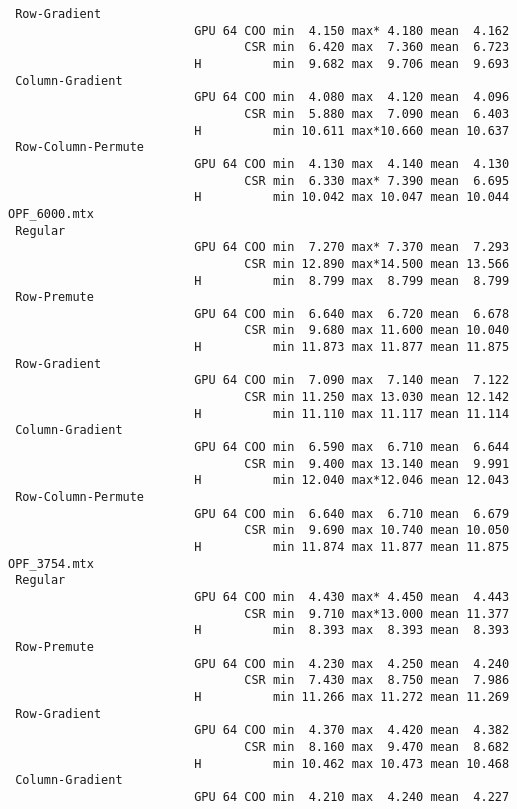 {\begin{verbatim}
 Row-Gradient
                          GPU 64 COO min  4.150 max* 4.180 mean  4.162
                                 CSR min  6.420 max  7.360 mean  6.723
                          H          min  9.682 max  9.706 mean  9.693
 Column-Gradient
                          GPU 64 COO min  4.080 max  4.120 mean  4.096
                                 CSR min  5.880 max  7.090 mean  6.403
                          H          min 10.611 max*10.660 mean 10.637
 Row-Column-Permute
                          GPU 64 COO min  4.130 max  4.140 mean  4.130
                                 CSR min  6.330 max* 7.390 mean  6.695
                          H          min 10.042 max 10.047 mean 10.044
OPF_6000.mtx
 Regular
                          GPU 64 COO min  7.270 max* 7.370 mean  7.293
                                 CSR min 12.890 max*14.500 mean 13.566
                          H          min  8.799 max  8.799 mean  8.799
 Row-Premute
                          GPU 64 COO min  6.640 max  6.720 mean  6.678
                                 CSR min  9.680 max 11.600 mean 10.040
                          H          min 11.873 max 11.877 mean 11.875
 Row-Gradient
                          GPU 64 COO min  7.090 max  7.140 mean  7.122
                                 CSR min 11.250 max 13.030 mean 12.142
                          H          min 11.110 max 11.117 mean 11.114
 Column-Gradient
                          GPU 64 COO min  6.590 max  6.710 mean  6.644
                                 CSR min  9.400 max 13.140 mean  9.991
                          H          min 12.040 max*12.046 mean 12.043
 Row-Column-Permute
                          GPU 64 COO min  6.640 max  6.710 mean  6.679
                                 CSR min  9.690 max 10.740 mean 10.050
                          H          min 11.874 max 11.877 mean 11.875
OPF_3754.mtx
 Regular
                          GPU 64 COO min  4.430 max* 4.450 mean  4.443
                                 CSR min  9.710 max*13.000 mean 11.377
                          H          min  8.393 max  8.393 mean  8.393
 Row-Premute
                          GPU 64 COO min  4.230 max  4.250 mean  4.240
                                 CSR min  7.430 max  8.750 mean  7.986
                          H          min 11.266 max 11.272 mean 11.269
 Row-Gradient
                          GPU 64 COO min  4.370 max  4.420 mean  4.382
                                 CSR min  8.160 max  9.470 mean  8.682
                          H          min 10.462 max 10.473 mean 10.468
 Column-Gradient
                          GPU 64 COO min  4.210 max  4.240 mean  4.227

\end{verbatim}}
